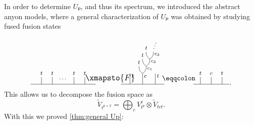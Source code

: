 In order to determine $Uₚ$, and thus its spectrum, we introduced the abstract anyon models, where a general characterization of $Uₚ$ was obtained by studying fused fusion states
\begin{equation}
  \begin{tikzpicture}[scale=0.18,font=\footnotesize,anchor=mid]
    \draw (-27, -1) to (-27, -3); %
    \node at (-27, 0) {$t$};
    \draw (-24, -1) to (-24, -3); %
    \node at (-24, 0) {$t$};
    \node at (-21, -1.5) {$\cdots$};
    \draw (-18, -1) to (-18, -3); %
    \node at (-18, 0) {$t$};
    \draw (-15, -1) to (-15, -3); %
    \node at (-15, 0) {$t$};
    \draw (-30, -3) to (-12, -3); %
    \node[font=\large] at (-8, -1.5) {$\xmapsto{F}$};
    \draw (2, 6) to [bend left=-30] (3, 4);
    \draw (4, 6) to [bend left=30]  (3, 4);
    \draw (1, 4) to [bend left=-30] (2, 2);
    \draw (3, 4) to [bend left=30]  (2, 2);
    \draw (0, 2) to [bend left=-30] (1, 0);
    \draw (2, 2) to [bend left=30]  (1, 0);
    \draw (1, 0) to (1, -3); %
    \node at (1+0.75, -0.75) {$c$};
    \node[font=\scriptsize] at (3, 1.5) {$c_1$};
    \node[font=\scriptsize] at (4, 3.5) {$c_2$};
    \node[font=\scriptsize] at (5, 5.5) {$c_3$};
    \node at (0, 2+1) {$t$};
    \node at (1, 4+1) {$t$};
    \node at (2, 6+1) {$t$};
    \node[rotate=-20] at (4.25, 6+1.25) {$\vdots$};
    \draw (-5, -3) to (7, -3); %
    \draw (-2.5, 0) to (-2.5, -3); %
    \draw (4.5, 0) to (4.5, -3); %
    \node at (-2.5+0.75, -0.75) {$t$};
    \node at (4.5+0.75, -0.75) {$t$};
    \node[font=\normalsize] at (11, -1.5) {$\eqqcolon$};
    \draw (17, -1) to (17, -3); %
    \draw (20, -1) to (20, -3); %
    \draw (23, -1) to (23, -3); %
    \node at (17, 0) {$t$};
    \node at (20, 0) {$c$};
    \node at (23, 0) {$t$};
    \draw (15, -3) to (25, -3); %
  \end{tikzpicture}.
\end{equation}
This allows us to decompose the fusion space as
\begin{equation}
  \widetilde{V}_{t^{p+2}} = ⨁_c V_{t^p}^c ⊗ \widetilde{V}_{tct}.
\end{equation}
With this we proved \cref{thm:general Up}:
